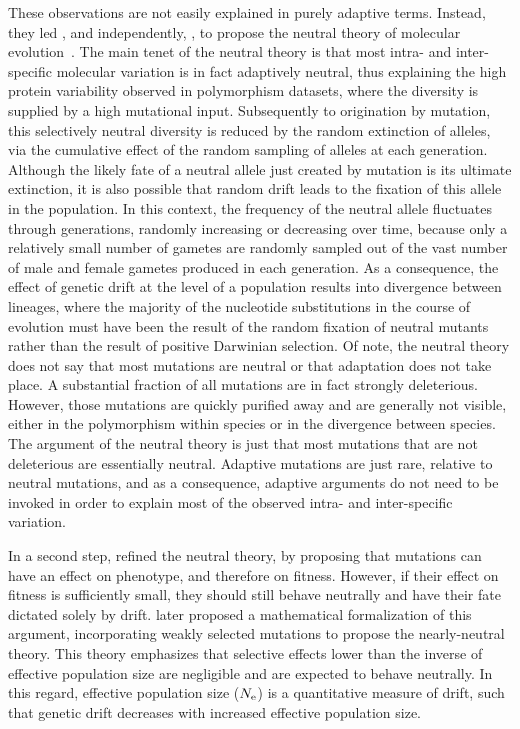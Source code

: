 These observations are not easily explained in purely adaptive terms.
Instead, they led \citet{Kimura1968}, and independently, \citet{King1969}, to propose the \gls{neutral} theory of molecular evolution~\citep{kimura1986dna, kimura1991neutral}.
The main tenet of the neutral theory is that most intra- and inter-specific molecular variation is in fact adaptively neutral, thus explaining the high protein variability observed in polymorphism datasets, where the diversity is supplied by a high mutational input.
Subsequently to origination by mutation, this selectively neutral diversity is reduced by the random extinction of alleles, via the cumulative effect of the random sampling of alleles at each generation.
Although the likely fate of a neutral allele just created by mutation is its ultimate extinction, it is also possible that random drift leads to the fixation of this allele in the population.
In this context, the frequency of the neutral allele fluctuates through generations, randomly increasing or decreasing over time, because only a relatively small number of gametes are randomly sampled out of the vast number of male and female gametes produced in each generation.
As a consequence, the effect of genetic drift at the level of a population results into divergence between lineages, where the majority of the nucleotide substitutions in the course of evolution must have been the result of the random fixation of neutral mutants rather than the result of positive Darwinian selection.
Of note, the neutral theory does not say that most mutations are neutral or that adaptation does not take place.
A substantial fraction of all mutations are in fact strongly deleterious.
However, those mutations are quickly purified away and are generally not visible, either in the polymorphism within species or in the divergence between species.
The argument of the neutral theory is just that most mutations that are not deleterious are essentially neutral.
Adaptive mutations are just rare, relative to neutral mutations, and as a consequence, adaptive arguments do not need to be invoked in order to explain most of the observed intra- and inter-specific variation.

In a second step, \citet{Ohta1971} refined the neutral theory, by proposing that mutations can have an effect on phenotype, and therefore on fitness.
However, if their effect on fitness is sufficiently small, they should still behave neutrally and have their fate dictated solely by drift.
\citet{ohta1973slightly} later proposed a mathematical formalization of this argument, incorporating weakly selected mutations to propose the \gls{nearly-neutral} theory.
This theory emphasizes that selective effects lower than the inverse of effective population size are negligible and are expected to behave neutrally.
In this regard, effective population size ($N_{\textrm{e}}$) is a quantitative measure of drift, such that genetic drift decreases with increased effective population size.

